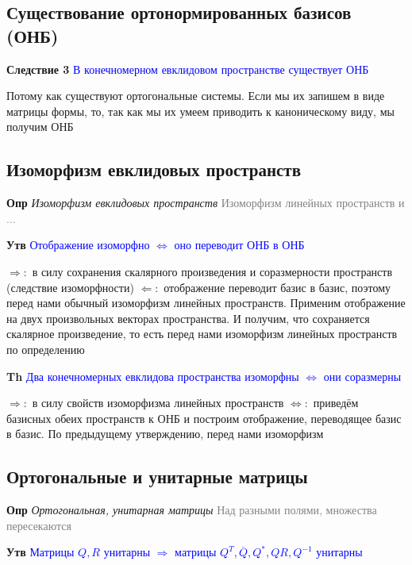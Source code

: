 \documentclass[a4paper, 14pt]{article}
\begin{document}
    \subsection{Существование ортонормированных базисов (ОНБ)}

    \textbf{Следствие 3} \textcolor{blue}{В конечномерном евклидовом пространстве существует ОНБ}

    Потому как существуют ортогональные системы.
    Если мы их запишем в виде матрицы формы, то, так как мы их умеем приводить к каноническому виду, мы получим ОНБ

    \subsection{Изоморфизм евклидовых пространств}

    \textbf{Опр} \textit{Изоморфизм евклидовых пространств} \textcolor{gray}{Изоморфизм линейных пространств и ...}

    \textbf{Утв} \textcolor{blue}{Отображение изоморфно $\Leftrightarrow$ оно переводит ОНБ в ОНБ}

    $\Rightarrow:$ в силу сохранения скалярного произведения и соразмерности пространств (следствие изоморфности)
    $\Leftarrow:$ отображение переводит базис в базис, поэтому перед нами обычный изоморфизм линейных
    пространств.
    Применим отображение на двух произвольных векторах пространства.
    И получим, что сохраняется скалярное произведение, то есть перед нами изоморфизм линейных пространств по определению

    \textbf{Th} \textcolor{blue}{Два конечномерных евклидова пространства изоморфны $\Leftrightarrow$ они соразмерны}

    $\Rightarrow:$ в силу свойств изоморфизма линейных пространств
    $\Leftrightarrow:$ приведём базисных обеих пространств к ОНБ и построим отображение, переводящее базис в базис.
    По предыдущему утверждению, перед нами изоморфизм

    \subsection{Ортогональные и унитарные матрицы}

    \textbf{Опр} \textit{Ортогональная, унитарная матрицы} \textcolor{gray}{Над разными полями, множества пересекаются}

    \textbf{Утв} \textcolor{blue}{Матрицы $Q, R$ унитарны $\Rightarrow$ матрицы $Q^T, \overline{Q}, Q^*, QR, Q^{-1}$
        унитарны}
\end{document}
